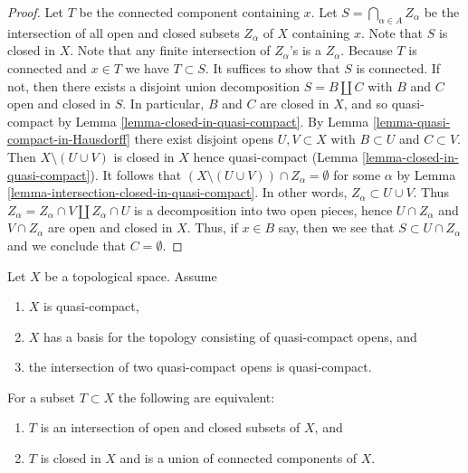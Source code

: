 \begin{proof}
Let $T$ be the connected component containing $x$.
Let $S = \bigcap_{\alpha \in A} Z_\alpha$ be the intersection of all
open and closed subsets $Z_\alpha$ of $X$ containing $x$.
Note that $S$ is closed in $X$.
Note that any finite intersection of $Z_\alpha$'s is a $Z_\alpha$.
Because $T$ is connected and $x \in T$ we have $T \subset S$.
It suffices to show that $S$ is connected.
If not, then there exists a disjoint union decomposition
$S = B \amalg C$ with $B$ and $C$ open and closed in $S$.
In particular, $B$ and $C$ are closed in $X$, and so quasi-compact by
Lemma \ref{lemma-closed-in-quasi-compact}.
By Lemma \ref{lemma-quasi-compact-in-Hausdorff}
there exist disjoint opens $U, V \subset X$ with $B \subset U$ and
$C \subset V$. Then $X \setminus (U \cup V)$ is closed in $X$
hence quasi-compact (Lemma \ref{lemma-closed-in-quasi-compact}).
It follows that $(X \setminus (U \cup V)) \cap Z_\alpha = \emptyset$
for some $\alpha$ by Lemma \ref{lemma-intersection-closed-in-quasi-compact}.
In other words, $Z_\alpha \subset U \cup V$. Thus
$Z_\alpha = Z_\alpha \cap V \amalg Z_\alpha \cap U$
is a decomposition into two open pieces,
hence $U \cap Z_\alpha$ and $V \cap Z_\alpha$ are open and closed in $X$.
Thus, if $x \in B$ say, then we see that $S \subset U \cap Z_\alpha$
and we conclude that $C = \emptyset$.
\end{proof}

\begin{lemma}
\label{lemma-closed-union-connected-components}
Let $X$ be a topological space.
Assume
\begin{enumerate}
\item $X$ is quasi-compact,
\item $X$ has a basis for the topology consisting of quasi-compact opens, and
\item the intersection of two quasi-compact opens is quasi-compact.
\end{enumerate}
For a subset $T \subset X$ the following are equivalent:
\begin{enumerate}
\item[(a)] $T$ is an intersection of open and closed subsets of $X$, and
\item[(b)] $T$ is closed in $X$ and is a union of connected components of $X$.
\end{enumerate}
\end{lemma}

